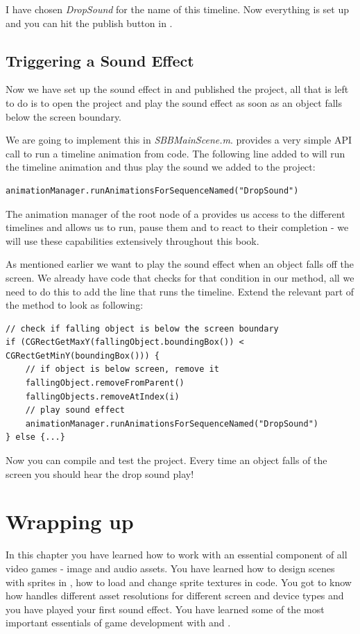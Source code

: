 I have chosen \textit{DropSound} for the name of this timeline. Now everything
is set up and you can hit the publish button in \SB{}.

\subsection{Triggering a Sound Effect}
Now we have set up the sound effect in \SB{} and published the project, all that
is left to do is to open the \xcode{} project and play the sound effect as soon
as an object falls below the screen boundary.

We are going to implement this in \textit{SBBMainScene.m}. \cocos{} provides a
very simple API call to run a timeline animation from code. The following line
added to  will run the timeline animation and thus play the
sound we added to the project:
\begin{lstlisting}
animationManager.runAnimationsForSequenceNamed("DropSound")
\end{lstlisting}
The animation manager of the root node of a \ccbfile{} provides us access to the
different timelines and allows us to run, pause them and to react to their
completion - we will use these capabilities extensively throughout this book.

As mentioned earlier we want to play the sound effect when an object falls off
the screen. We already have code that checks for that condition in our
 method, all we need to do this to add the line that runs the
timeline. Extend the relevant part of the  method to look as
following:
\begin{lstlisting}
// check if falling object is below the screen boundary
if (CGRectGetMaxY(fallingObject.boundingBox()) < CGRectGetMinY(boundingBox())) {
	// if object is below screen, remove it
    fallingObject.removeFromParent()
    fallingObjects.removeAtIndex(i)
    // play sound effect
    animationManager.runAnimationsForSequenceNamed("DropSound")
} else {...}
\end{lstlisting}
Now you can compile and test the project. Every time an object falls of the
screen you should hear the drop sound play!
\section{Wrapping up}
In this chapter you have learned how to work with an essential component of all
video games - image and audio assets. You have learned how to design scenes with
sprites in \SB{}, how to load and change sprite textures in code. You got to
know how \SB{} handles different asset resolutions for different screen and
device types and you have played your first sound effect. You have learned some
of the most important essentials of game development with \SB{} and \cocos{}.

